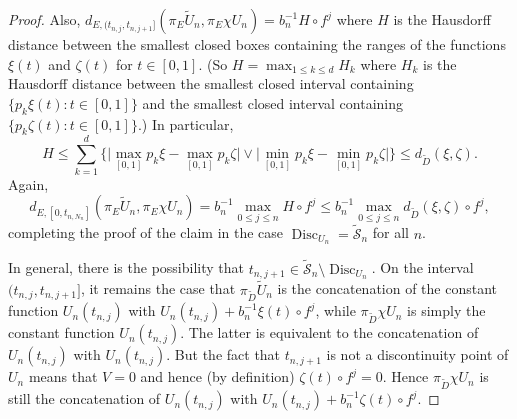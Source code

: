 \documentclass[10pt,a4paper]{amsart}
\newcommand{\disc}{\operatorname{Disc}}
\newcommand{\tD}{{\widetilde D}}
\newcommand{\tU}{{\widetilde U}}
\newcommand{\tcS}{{\widetilde{\mathcal S}}}
\begin{document}
\begin{proof}
Also,
$d_{E,(t_{n,j},t_{n,j+1}]}(\pi_E \tU_n,\pi_E \chi U_n)=b_n^{-1}H\circ f^j$
where $H$ is the Hausdorff distance between the smallest closed boxes containing 
the ranges of the functions $\xi(t)$
and $\zeta(t)$ for $t\in[0,1]$.
(So $H=\max_{1\le k\le d}H_k$ where $H_k$ is the Hausdorff distance between 
the smallest closed interval containing 
$\{p_k\xi(t):t\in[0,1]\}$ and
the smallest closed interval containing 
$\{p_k\zeta(t):t\in[0,1]\}$.)
In particular,
\[
H\le\sum_{k=1}^d\Big\{\Big|\max_{[0,1]}p_k\xi-\max_{[0,1]}p_k\zeta\Big|\vee
\Big|\min_{[0,1]}p_k\xi-\min_{[0,1]}p_k\zeta\Big|\Big\}
\le d_\tD(\xi,\zeta).
\]
Again,
\[
d_{E,[0,t_{n,N_n}]}(\pi_E \tU_n,\pi_E \chi U_n)
= b_n^{-1}\max_{0\le j\le n}H\circ f^j
\le  b_n^{-1}\max_{0\le j\le n}d_\tD(\xi,\zeta)\circ f^j,
\]
completing the proof of the claim in the case $\disc_{U_n}=\tcS_n$ for all $n$. 

In general, there is the possibility that $t_{n,j+1}\in\tcS_n\setminus \disc_{U_n}$.
On the interval $(t_{n,j},t_{n,j+1}]$, it remains the case that
$\pi_\tD \tU_n$ is the concatenation of the constant function $U_n(t_{n,j})$ with $U_n(t_{n,j})+b_n^{-1} \xi(t) \circ f^j$, while
$\pi_\tD \chi U_n$ is simply the 
constant function $U_n(t_{n,j})$. The latter is equivalent to
the concatenation of $U_n(t_{n,j})$ with 
$U_n(t_{n,j})$. 
But the fact that $t_{n,j+1}$ is not a discontinuity point of $U_n$ means that $V=0$ and hence (by definition) $\zeta(t)\circ f^j=0$.
Hence
$\pi_\tD \chi U_n$ is still the
concatenation of 
$U_n(t_{n,j})$ with
$U_n(t_{n,j})+b_n^{-1}\zeta(t)\circ f^j$. 
\end{proof}
\end{document}
